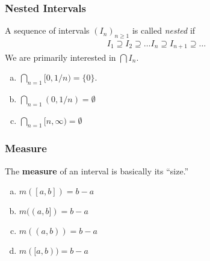 \documentclass[10pt]{extarticle}
\begin{document}
    \subsubsection{Nested Intervals}%
    A sequence of intervals $(I_n)_{n \geq 1}$ is called \textsl{nested} if
    \begin{align*}
      I_1 \supseteq I_2 \supseteq \dots I_n \supseteq I_{n+1} \supseteq\dots
    \end{align*}
    We are primarily interested in $\bigcap I_n$.
    \begin{enumerate}[(a)]
      \item $\bigcap_{n=1}[0,1/n) = \{0\}$.
      \item $\bigcap_{n=1}(0,1/n) = \emptyset$
      \item $\bigcap_{n=1}[n,\infty) = \emptyset$
    \end{enumerate}
    \subsubsection{Measure}%
    The \textbf{measure} of an interval is basically its ``size.''
    \begin{enumerate}[(a)]
      \item $m([a,b]) = b-a$
      \item $m((a,b]) = b-a$
      \item $m((a,b)) = b-a$
      \item $m([a,b)) = b-a$
    \end{enumerate}
\end{document}
